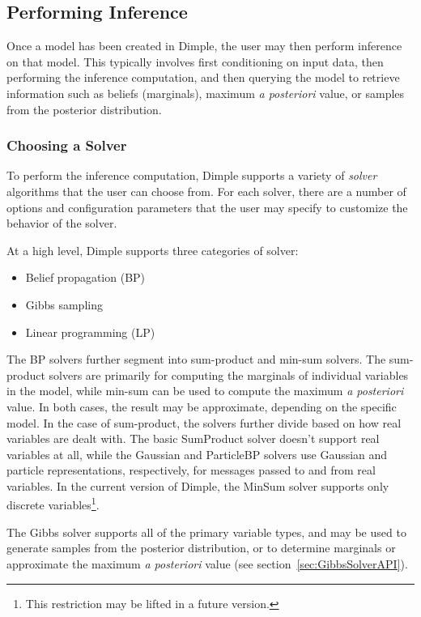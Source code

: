 \subsection{Performing Inference}

Once a model has been created in Dimple, the user may then perform inference on that model.  This typically involves first conditioning on input data, then performing the inference computation, and then querying the model to retrieve information such as beliefs (marginals), maximum \emph{a posteriori} value, or samples from the posterior distribution.

\subsubsection{Choosing a Solver}
\label{sec:Solvers}

To perform the inference computation, Dimple supports a variety of \emph{solver} algorithms that the user can choose from.  For each solver, there are a number of options and configuration parameters that the user may specify to customize the behavior of the solver.

At a high level, Dimple supports three categories of solver:

\begin{itemize}
\item Belief propagation (BP)
\item Gibbs sampling
\item Linear programming (LP)
\end{itemize}

The BP solvers further segment into sum-product and min-sum solvers.  The sum-product solvers are primarily for computing the marginals of individual variables in the model, while min-sum can be used to compute the maximum \emph{a posteriori} value.  In both cases, the result may be approximate, depending on the specific model.  In the case of sum-product, the solvers further divide based on how real variables are dealt with.  The basic SumProduct solver doesn't support real variables at all, while the Gaussian and ParticleBP solvers use Gaussian and particle representations, respectively, for messages passed to and from real variables.  In the current version of Dimple, the MinSum solver supports only discrete variables\footnote{This restriction may be lifted in a future version.}.

The Gibbs solver supports all of the primary variable types, and may be used to generate samples from the posterior distribution, or to determine marginals or approximate the maximum \emph{a posteriori} value (see section~\ref{sec:GibbsSolverAPI}).

